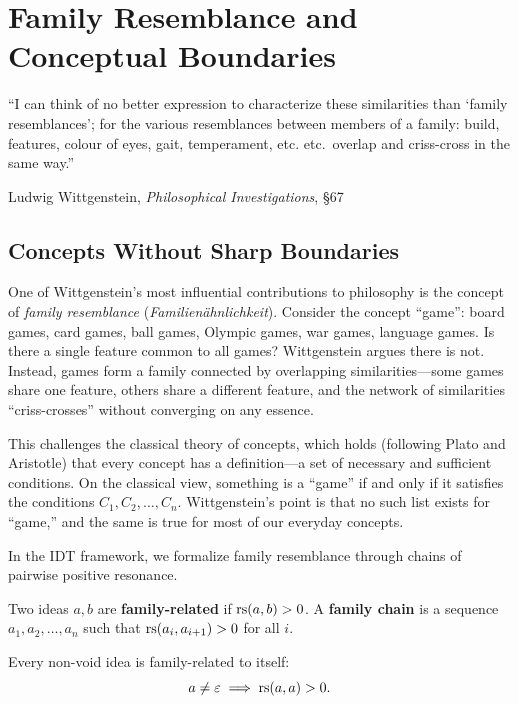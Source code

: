 \chapter{Family Resemblance and Conceptual Boundaries}
\label{ch:family-resemblance}

\epigraph{``I can think of no better expression to characterize these
similarities than `family resemblances'; for the various resemblances between
members of a family: build, features, colour of eyes, gait, temperament, etc.
etc.\ overlap and criss-cross in the same way.''}{Ludwig Wittgenstein, \textit{Philosophical Investigations}, \S67}

\section{Concepts Without Sharp Boundaries}

One of Wittgenstein's most influential contributions to philosophy is the
concept of \emph{family resemblance} (\textit{Familien\"ahnlichkeit}).
Consider the concept ``game'': board games, card games, ball games, Olympic
games, war games, language games. Is there a single feature common to all games?
Wittgenstein argues there is not. Instead, games form a family connected by
overlapping similarities---some games share one feature, others share a
different feature, and the network of similarities ``criss-crosses'' without
converging on any essence.

This challenges the classical theory of concepts, which holds (following Plato
and Aristotle) that every concept has a definition---a set of necessary and
sufficient conditions. On the classical view, something is a ``game'' if and
only if it satisfies the conditions \(C_1, C_2, \ldots, C_n\). Wittgenstein's
point is that no such list exists for ``game,'' and the same is true for most
of our everyday concepts.

In the IDT framework, we formalize family resemblance through chains of
pairwise positive resonance.

\begin{definition}
\label{def:family-related}
Two ideas $a, b$ are \textbf{family-related} if $\mathrm{rs}(a, b) > 0$.
A \textbf{family chain} is a sequence $a_1, a_2, \ldots, a_n$ such that
$\mathrm{rs}(a_i, a_{i+1}) > 0$ for all $i$.
\end{definition}

\begin{theorem}
\label{thm:self-related}
Every non-void idea is family-related to itself:
\[
a \neq \varepsilon \implies \mathrm{rs}(a, a) > 0.
\]
\end{theorem}


